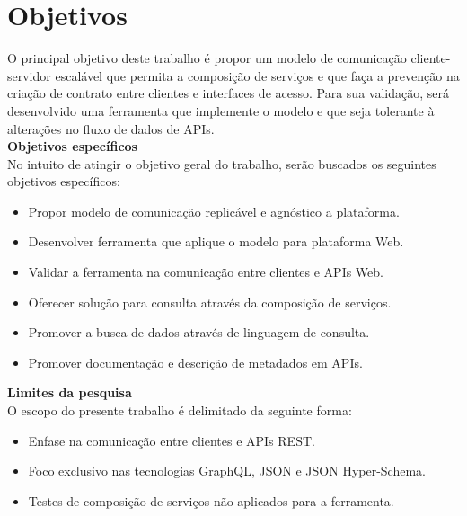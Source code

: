 \section[Objetivos]{Objetivos}

O principal objetivo deste trabalho é propor um modelo de comunicação cliente-servidor escalável que permita a composição de serviços e que faça a prevenção na criação de contrato entre clientes e interfaces de acesso. Para sua validação, será desenvolvido uma ferramenta que implemente o modelo e que seja tolerante à alterações no fluxo de dados de APIs. \\

\textbf{Objetivos específicos} \\

No intuito de atingir o objetivo geral do trabalho, serão buscados os seguintes objetivos específicos:

\begin{itemize}
\item Propor modelo de comunicação replicável e agnóstico a plataforma.
\item Desenvolver ferramenta que aplique o modelo para plataforma Web.
\item Validar a ferramenta na comunicação entre clientes e APIs Web.
\item Oferecer solução para consulta através da composição de serviços.
\item Promover a busca de dados através de linguagem de consulta.
\item Promover documentação e descrição de metadados em APIs. \\
\end{itemize}

\textbf{Limites da pesquisa} \\

O escopo do presente trabalho é delimitado da seguinte forma:

\begin{itemize}
\item Enfase na comunicação entre clientes e APIs REST.
\item Foco exclusivo nas tecnologias GraphQL, JSON e JSON Hyper-Schema.
\item Testes de composição de serviços não aplicados para a ferramenta.
\end{itemize}
